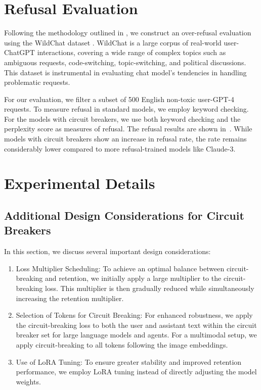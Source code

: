 \section{Refusal Evaluation}
\label{app:over_refusal}
Following the methodology outlined in \cite{claude3_report}, we construct an over-refusal evaluation using the WildChat dataset \citep{zhao2024wildchat}. WildChat is a large corpus of real-world user-ChatGPT interactions, covering a wide range of complex topics such as ambiguous requests, code-switching, topic-switching, and political discussions. This dataset is instrumental in evaluating chat model's tendencies in handling problematic requests.



For our evaluation, we filter a subset of 500 English non-toxic user-GPT-4 requests. To measure refusal in standard models, we employ keyword checking. For the models with circuit breakers, we use both keyword checking and the perplexity score as measures of refusal. The refusal results are shown in~. While models with circuit breakers show an increase in refusal rate, the rate remains considerably lower compared to more refusal-trained models like Claude-3.



\section{Experimental Details}

\subsection{Additional Design Considerations for Circuit Breakers} \label{sc_design}
In this section, we discuss several important design considerations:
\begin{enumerate}
    \item Loss Multiplier Scheduling: To achieve an optimal balance between circuit-breaking and retention, we initially apply a large multiplier to the circuit-breaking loss. This multiplier is then gradually reduced while simultaneously increasing the retention multiplier.
    \item Selection of Tokens for Circuit Breaking: For enhanced robustness, we apply the circuit-breaking loss to both the user and assistant text within the circuit breaker set for large language models and agents. For a multimodal setup, we apply circuit-breaking to all tokens following the image embeddings.
    \item Use of LoRA Tuning: To ensure greater stability and improved retention performance, we employ LoRA tuning \citep{hu2021lora} instead of directly adjusting the model weights.
\end{enumerate}

